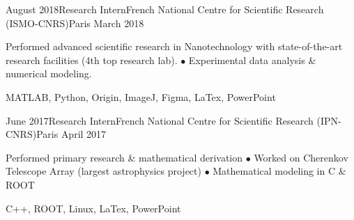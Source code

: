 %
%
%
\begin{experiences}
  \experience
    {August 2018}{Research Intern}{French National Centre for Scientific Research (ISMO-CNRS)}{Paris}
    {March 2018}
    {
\begin{description}
Performed advanced scientific research in Nanotechnology with state-of-the-art research facilities (4th top research lab). $\bullet$ Experimental data analysis \& numerical modeling.
\end{description}
}
    {MATLAB, Python, Origin, ImageJ, Figma, LaTex, PowerPoint}
\end{experiences}

\begin{experiences}
  \experience
    {June 2017}{Research Intern}{French National Centre for Scientific Research (IPN-CNRS)}{Paris}
    {April 2017}
    {
\begin{description}
Performed primary research \& mathematical derivation $\bullet$ Worked on Cherenkov Telescope Array (largest astrophysics project) $\bullet$ Mathematical modeling in C \& ROOT
\end{description}
}
    {C++, ROOT, Linux, LaTex, PowerPoint}
\end{experiences} 